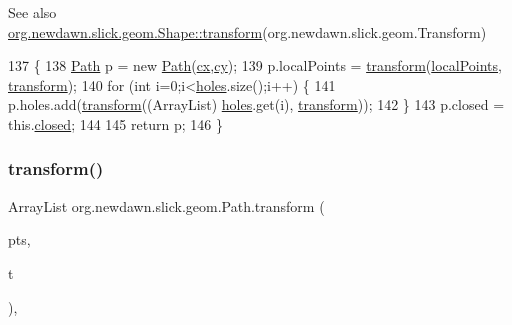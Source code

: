 \begin{DoxySeeAlso}{See also}
\mbox{\hyperlink{classorg_1_1newdawn_1_1slick_1_1geom_1_1_shape_a463826a085479c379e40f012e970b997}{org.\+newdawn.\+slick.\+geom.\+Shape\+::transform}}(org.\+newdawn.\+slick.\+geom.\+Transform) 
\end{DoxySeeAlso}

\begin{DoxyCode}
137                                                 \{
138         \mbox{\hyperlink{classorg_1_1newdawn_1_1slick_1_1geom_1_1_path_a5fef0f2e57590f14cccad52e87d5c0bb}{Path}} p = \textcolor{keyword}{new} \mbox{\hyperlink{classorg_1_1newdawn_1_1slick_1_1geom_1_1_path_a5fef0f2e57590f14cccad52e87d5c0bb}{Path}}(\mbox{\hyperlink{classorg_1_1newdawn_1_1slick_1_1geom_1_1_path_acbc8efe2abb56bf2aa33889ec35a2e3b}{cx}},\mbox{\hyperlink{classorg_1_1newdawn_1_1slick_1_1geom_1_1_path_aecd6f6aaf8fd79b3acec8a24c2fd1a83}{cy}});
139         p.localPoints = \mbox{\hyperlink{classorg_1_1newdawn_1_1slick_1_1geom_1_1_path_a17055610942f82343760c043ace084df}{transform}}(\mbox{\hyperlink{classorg_1_1newdawn_1_1slick_1_1geom_1_1_path_af67630a074a387ccbe4ea8ad67e013d8}{localPoints}}, \mbox{\hyperlink{classorg_1_1newdawn_1_1slick_1_1geom_1_1_path_a17055610942f82343760c043ace084df}{transform}});
140         \textcolor{keywordflow}{for} (\textcolor{keywordtype}{int} i=0;i<\mbox{\hyperlink{classorg_1_1newdawn_1_1slick_1_1geom_1_1_path_aaed98e69613a609d6461530dc8c2f20b}{holes}}.size();i++) \{
141             p.holes.add(\mbox{\hyperlink{classorg_1_1newdawn_1_1slick_1_1geom_1_1_path_a17055610942f82343760c043ace084df}{transform}}((ArrayList) \mbox{\hyperlink{classorg_1_1newdawn_1_1slick_1_1geom_1_1_path_aaed98e69613a609d6461530dc8c2f20b}{holes}}.get(i), 
      \mbox{\hyperlink{classorg_1_1newdawn_1_1slick_1_1geom_1_1_path_a17055610942f82343760c043ace084df}{transform}}));
142         \}
143         p.closed = this.\mbox{\hyperlink{classorg_1_1newdawn_1_1slick_1_1geom_1_1_path_a237262eda546795e1ff49f4d8da5c383}{closed}};
144         
145         \textcolor{keywordflow}{return} p;
146     \}
\end{DoxyCode}
\mbox{\label{classorg_1_1newdawn_1_1slick_1_1geom_1_1_path_ae23520204ac0d447d1ca0e88467c8efe}} 
\subsubsection{\texorpdfstring{transform()}{transform()}\hspace{0.1cm}{\footnotesize\ttfamily [2/2]}}
{\footnotesize\ttfamily Array\+List org.\+newdawn.\+slick.\+geom.\+Path.\+transform (\begin{DoxyParamCaption}\item[{Array\+List}]{pts,  }\item[{Transform}]{t }\end{DoxyParamCaption})\hspace{0.3cm}{\ttfamily [inline]}, {\ttfamily [private]}}

